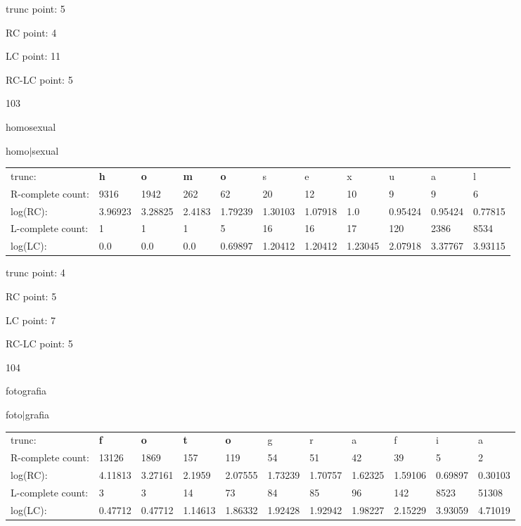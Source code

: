 \documentclass{article}
\begin{document}
trunc point: 5

RC point: 4

LC point: 11

RC-LC point: 5

\vspace{3em}



103

homosexual

homo$|$sexual

\vspace{1em}

\begin{tabular}{l|llllllllll}

trunc: & {\color{red}\bf h} & {\color{red}\bf o} & {\color{red}\bf m} & {\color{red}\bf o} & s & e & x & u & a & l \\ 
R-complete count: & 9316 & 1942 & 262 & 62 & 20 & 12 & 10 & 9 & 9 & 6 \\ 
log(RC): & 3.96923 & 3.28825 & 2.4183 & 1.79239 & 1.30103 & 1.07918 & 1.0 & 0.95424 & 0.95424 & 0.77815 \\ 
L-complete count: & 1 & 1 & 1 & 5 & 16 & 16 & 17 & 120 & 2386 & 8534 \\ 
log(LC): & 0.0 & 0.0 & 0.0 & 0.69897 & 1.20412 & 1.20412 & 1.23045 & 2.07918 & 3.37767 & 3.93115 \\ 
\end{tabular}

trunc point: 4

RC point: 5

LC point: 7

RC-LC point: 5

\vspace{3em}



104

fotografia

foto$|$grafia

\vspace{1em}

\begin{tabular}{l|llllllllll}

trunc: & {\color{red}\bf f} & {\color{red}\bf o} & {\color{red}\bf t} & {\color{red}\bf o} & g & r & a & f & i & a \\ 
R-complete count: & 13126 & 1869 & 157 & 119 & 54 & 51 & 42 & 39 & 5 & 2 \\ 
log(RC): & 4.11813 & 3.27161 & 2.1959 & 2.07555 & 1.73239 & 1.70757 & 1.62325 & 1.59106 & 0.69897 & 0.30103 \\ 
L-complete count: & 3 & 3 & 14 & 73 & 84 & 85 & 96 & 142 & 8523 & 51308 \\ 
log(LC): & 0.47712 & 0.47712 & 1.14613 & 1.86332 & 1.92428 & 1.92942 & 1.98227 & 2.15229 & 3.93059 & 4.71019 \\ 
\end{tabular}
\end{document}
